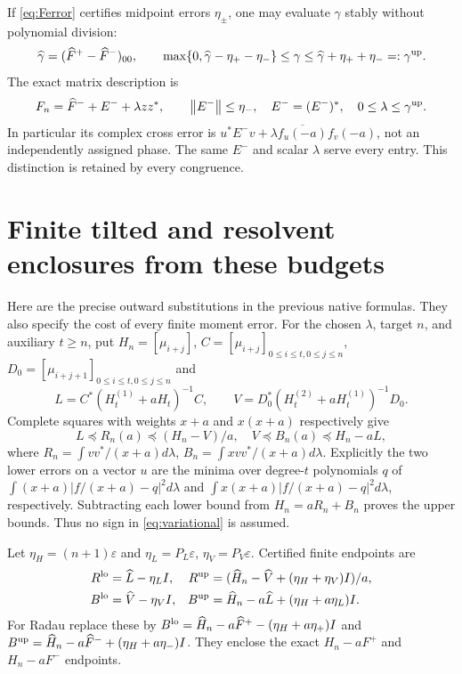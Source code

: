 \documentclass[11pt]{article}
\newcommand{\norm}[1]{\left\lVert#1\right\rVert}
\begin{document}
If \eqref{eq:Ferror} certifies midpoint errors $\eta_\pm$,
one may evaluate $\gamma$ stably without polynomial division:
\begin{equation}\label{eq:gammaout}
 \widehat\gamma=(\widehat F^+-\widehat F^-)_{00},\qquad
 \max\{0,\widehat\gamma-\eta_+-\eta_-\}\le\gamma
 \le\widehat\gamma+\eta_++\eta_-=: \gamma^{\rm up}.
\end{equation}
The exact matrix description is
\begin{equation}\label{eq:phaseout}
 F_n=\widehat F^-+E^-+\lambda zz^*,\qquad
 \norm{E^-}\le\eta_-,\quad E^-=(E^-)^*,\quad
 0\le\lambda\le\gamma^{\rm up}.
\end{equation}
In particular its complex cross error is
$u^*E^-v+\lambda\overline{f_u(-a)}f_v(-a)$, not an
independently assigned phase. The same $E^-$ and scalar $\lambda$
serve every entry. This distinction is retained by every congruence.

\section{Finite tilted and resolvent enclosures from these budgets}

Here are the precise outward substitutions in the previous native
formulas. They also specify the cost of every finite moment error.
For the chosen $\lambda$, target $n$, and auxiliary $t\ge n$,
put $H_n=[\mu_{i+j}]$, $C=[\mu_{i+j}]_{0\le i\le t,0\le j\le n}$,
$D_0=[\mu_{i+j+1}]_{0\le i\le t,0\le j\le n}$ and
\[
 L=C^*(H_t^{(1)}+aH_t)^{-1}C,\qquad
 V=D_0^*(H_t^{(2)}+aH_t^{(1)})^{-1}D_0.
\]
Complete squares with weights $x+a$ and $x(x+a)$ respectively
give
\begin{equation}\label{eq:variational}
 L\preceq R_n(a)\preceq(H_n-V)/a,\quad
 V\preceq B_n(a)\preceq H_n-aL,
\end{equation}
where $R_n=\int vv^*/(x+a)d\lambda$,
$B_n=\int xvv^*/(x+a)d\lambda$. Explicitly the two lower
errors on a vector $u$ are the minima over degree-$t$ polynomials
$q$ of $\int(x+a)|f/(x+a)-q|^2d\lambda$ and
$\int x(x+a)|f/(x+a)-q|^2d\lambda$, respectively.
Subtracting each lower bound from $H_n=aR_n+B_n$ proves the
upper bounds. Thus no sign in \eqref{eq:variational} is assumed.

Let $\eta_H=(n+1)\varepsilon$ and $\eta_L=P_L\varepsilon$,
$\eta_V=P_V\varepsilon$. Certified finite endpoints are
\begin{equation}\label{eq:outvar}
 \begin{aligned}
 R^{\rm lo}&=\widehat L-\eta_LI,&
 R^{\rm up}&=(\widehat H_n-\widehat V+(\eta_H+\eta_V)I)/a,\\
 B^{\rm lo}&=\widehat V-\eta_VI,&
 B^{\rm up}&=\widehat H_n-a\widehat L+(\eta_H+a\eta_L)I.
 \end{aligned}
\end{equation}
For Radau replace these by
$B^{\rm lo}=\widehat H_n-a\widehat F^+-(\eta_H+a\eta_+)I$
and
$B^{\rm up}=\widehat H_n-a\widehat F^-+(\eta_H+a\eta_-)I$.
They enclose the exact $H_n-aF^+$ and $H_n-aF^-$ endpoints.
\end{document}
